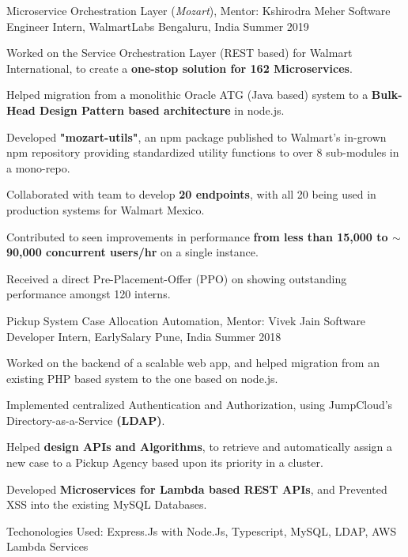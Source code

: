 \begin{cventries}
  \cventry
  {Microservice Orchestration Layer (\textit{Mozart}), Mentor: Kshirodra Meher}
  {Software Engineer Intern, WalmartLabs}
  {Bengaluru, India}
  {Summer 2019}
  {
    \begin{cvitems}
    \item Worked on the Service Orchestration Layer (REST based) for Walmart International, to create a \textbf{one-stop solution for 162 Microservices}.
    \item Helped migration from a monolithic Oracle ATG (Java based) system to a \textbf{Bulk-Head Design Pattern based architecture} in node.js.
    \item Developed \textbf{"mozart-utils"}, an npm package published to Walmart's in-grown npm repository providing standardized utility functions to over 8 sub-modules in a mono-repo.
    \item Collaborated with team to develop \textbf{20 endpoints}, with all 20 being used in production systems for Walmart Mexico.
    \item Contributed to seen improvements in performance \textbf{from less than 15,000 to $\sim$ 90,000 concurrent users/hr} on a single instance.
    \item Received a direct Pre-Placement-Offer (PPO) on showing outstanding performance amongst 120 interns.
    \end{cvitems}
  }

  \cventry
  {Pickup System Case Allocation Automation, Mentor: Vivek Jain}
  {Software Developer Intern, EarlySalary}
  {Pune, India}
  {Summer 2018}
  {
    \begin{cvitems}
	\item Worked on the backend of a scalable web app, and helped migration from an existing PHP based system to the one based on node.js.
	\item Implemented centralized Authentication and Authorization, using JumpCloud’s Directory-as-a-Service \textbf{(LDAP)}.
\item Helped \textbf{design APIs and Algorithms}, to retrieve and automatically assign a new case to a Pickup Agency based upon its priority in a cluster.
\item Developed \textbf{Microservices for Lambda based REST APIs}, and Prevented XSS into the existing MySQL Databases.
\item Techonologies Used: Express.Js with Node.Js, Typescript, MySQL,
LDAP, AWS Lambda Services
    \end{cvitems}
  }

\end{cventries}
